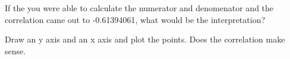 \documentclass[11pt]{article}
\begin{document}
If the you were able to calculate the numerator and denomenator and the correlation came out to -0.61394061, what would be the interpretation? 
\newline 
\newline  
\newline
\newline 


Draw an y axis and an x axis and plot the points. Does the correlation make sense. 
\newline 
\newline  
\newline
\newline 
\newline 
\newline  
\newline
\newline 
\end{document}
